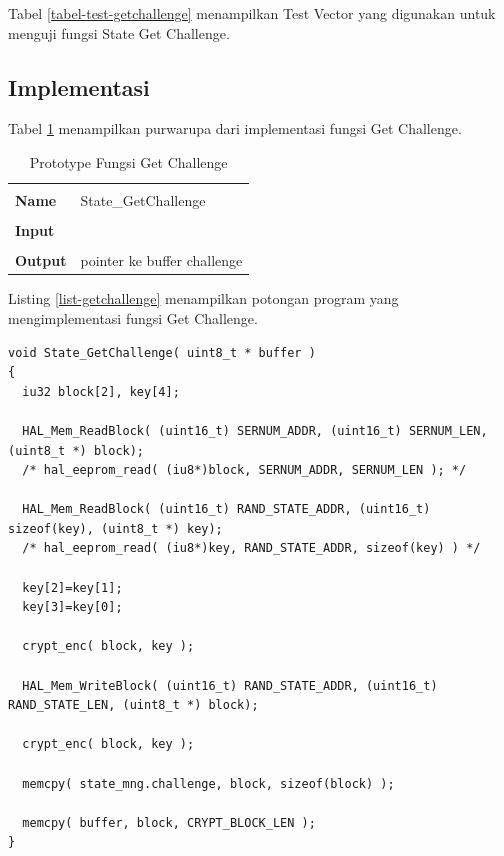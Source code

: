 Tabel \ref{tabel-test-getchallenge} menampilkan Test Vector yang digunakan untuk menguji fungsi State Get Challenge.

\subsection {Implementasi}

Tabel \ref{tabel-getchallenge} menampilkan purwarupa dari implementasi fungsi Get Challenge. 

\begin{table}[h]
  \centering
  \begin{tabular}{p{2cm} p{8cm}}
    \hline\\
    {\bf Name} & State\_GetChallenge\\
    \hline\\
    {\bf Input} & 
    \\
    \hline\\
    {\bf Output} & pointer ke buffer challenge
    \\
    \hline
  \end{tabular}
  \caption{Prototype Fungsi Get Challenge}
  \label{tabel-getchallenge}
\end{table}

Listing \ref{list-getchallenge} menampilkan potongan program yang mengimplementasi fungsi Get Challenge.

\begin{lstlisting}[caption={Listing Program Fungsi Get Challenge}, label={list-getchallenge}]
void State_GetChallenge( uint8_t * buffer )
{
  iu32 block[2], key[4];

  HAL_Mem_ReadBlock( (uint16_t) SERNUM_ADDR, (uint16_t) SERNUM_LEN, (uint8_t *) block);
  /* hal_eeprom_read( (iu8*)block, SERNUM_ADDR, SERNUM_LEN ); */

  HAL_Mem_ReadBlock( (uint16_t) RAND_STATE_ADDR, (uint16_t) sizeof(key), (uint8_t *) key);
  /* hal_eeprom_read( (iu8*)key, RAND_STATE_ADDR, sizeof(key) ) */

  key[2]=key[1];
  key[3]=key[0];

  crypt_enc( block, key );

  HAL_Mem_WriteBlock( (uint16_t) RAND_STATE_ADDR, (uint16_t) RAND_STATE_LEN, (uint8_t *) block);

  crypt_enc( block, key );

  memcpy( state_mng.challenge, block, sizeof(block) );

  memcpy( buffer, block, CRYPT_BLOCK_LEN );
}
\end{lstlisting}


